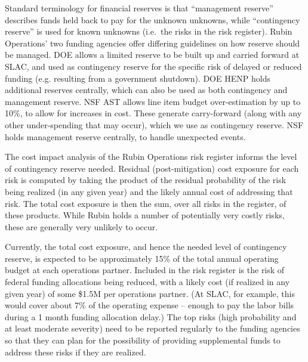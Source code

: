Standard terminology for financial reserves is that ``management reserve'' describes funds held back to pay for the unknown unknowns, while ``contingency reserve'' is used for known unknowns (i.e.\ the risks in the risk register).
Rubin \gls{Operations}' two funding agencies offer differing guidelines on how reserve should be managed.
\gls{DOE} allows a limited reserve to be built up and carried forward at \gls{SLAC}, and used as contingency reserve for the specific risk of delayed or reduced funding (e.g. resulting from a government shutdown).
\gls{DOE} \gls{HENP} holds additional reserves centrally, which can also be used as both contingency and management reserve.
\gls{NSF} \gls{AST} allows line item budget over-estimation by up to 10\%, to allow for increases in cost.
These generate carry-forward (along with any other under-spending that may occur), which we use as contingency reserve.
\gls{NSF} holds management reserve centrally, to handle unexpected events.

The cost impact analysis of the \gls{Rubin Operations} risk register informs the level of contingency reserve needed.
Residual (post-mitigation) cost exposure for each risk is computed by taking the  product of the residual probability of the risk being realized (in any given year) and the likely annual cost of addressing that risk.
The total cost exposure is then the sum, over all risks in the register, of these products.
While Rubin holds a number of potentially very costly risks, these are generally very unlikely to occur.

Currently, the total cost exposure, and hence the needed level of contingency reserve, is expected to be approximately 15\% of the total annual operating budget at each operations partner.
Included in the risk register is the risk of federal funding allocations being reduced, with a likely cost (if realized in any given year) of some \$1.5M per operations partner.
(At \gls{SLAC}, for example, this would cover about 7\% of the operating expense -- enough to pay the labor bills during a 1 month funding allocation delay.) The top risks (high probability and at least moderate severity) need to be reported regularly to the funding agencies so that they can plan for the possibility of providing supplemental funds to address these risks if they are realized.

